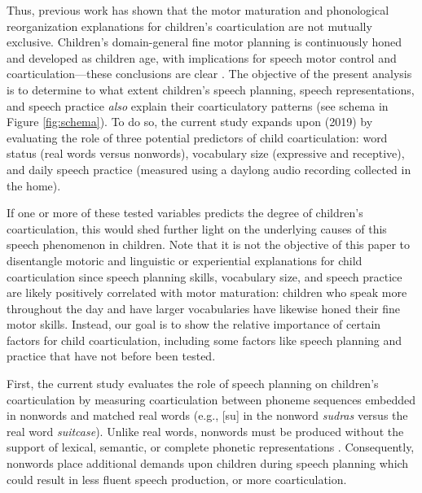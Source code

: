 \documentclass[a4paper,man,natbib,donotrepeattitle, apacite]{apa6}
\begin{document}
Thus, previous work has shown that the motor maturation and phonological reorganization explanations for children’s coarticulation are not mutually exclusive. Children’s domain-general fine motor planning is continuously honed and developed as children age, with implications for speech motor control and coarticulation---these conclusions are clear \cite{barbierWhatAnticipatoryCoarticulation2020,rubertusDevelopmentGesturalOrganization2018,zharkovaUltrasoundStudyDevelopment2018}. The objective of the present analysis is to determine to what extent children’s speech planning, speech representations, and speech practice \textit{also} explain their coarticulatory patterns (see schema in Figure \ref{fig:schema}). To do so, the current study expands upon \citeauthor{noiraySpokenLanguageDevelopment2019} (2019) by evaluating the role of three potential predictors of child coarticulation: word status (real words versus nonwords), vocabulary size (expressive and receptive), and daily speech practice (measured using a daylong audio recording collected in the home).

If one or more of these tested variables predicts the degree of children’s coarticulation, this would shed further light on the underlying causes of this speech phenomenon in children. Note that it is not the objective of this paper to disentangle motoric and linguistic or experiential explanations for child coarticulation since speech planning skills, vocabulary size, and speech practice are likely positively correlated with motor maturation: children who speak more throughout the day and have larger vocabularies have likewise honed their fine motor skills. Instead, our goal is to show the relative importance of certain factors for child coarticulation, including some factors like speech planning and practice that have not before been tested. 

First, the current study evaluates the role of speech planning on children’s coarticulation by measuring coarticulation between phoneme sequences embedded in nonwords and matched real words (e.g., [su] in the nonword \textit{sudras} versus the real word \textit{suitcase}). Unlike real words, nonwords must be produced without the support of lexical, semantic, or complete phonetic representations \cite{chiatPreschoolRepetitionTest2007,cychoszLexicalAdvantageFouryearold2020,gathercoleInfluencesNumberSyllables1991,keren-portnoyRoleVocalPractice2010}. Consequently, nonwords place additional demands upon children during speech planning which could result in less fluent speech production, or more coarticulation.
\end{document}
